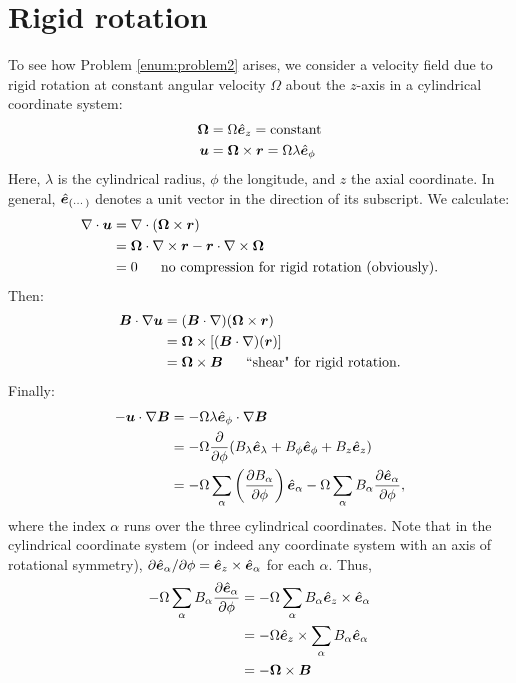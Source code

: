 \documentclass[12pt]{article}
\newcommand{\vecrot}{\bm{\Omega}}
\newcommand{\vecr}{\bm{r}}
\begin{document}
\section{Rigid rotation}
To see how Problem \ref{enum:problem2} arises, we consider a velocity field due to rigid rotation at constant angular velocity $\Omega$ about the $z$-axis in a cylindrical coordinate system:
\begin{subequations}
	\begin{align}
		\vecrot &= \Omega\ez=\text{constant}\\
		\vecu&=\vecrot\times\bm{r} = \Omega\lambda\ep
	\end{align}
\end{subequations}
Here, $\lambda$ is the cylindrical radius, $\phi$ the longitude, and $z$ the axial coordinate. In general,  $\hat{\bm{e}}_{(\cdots)}$ denotes a unit vector in the direction of its subscript. We calculate:
\begin{align}
	\Div\vecu&=\Div(\vecrot\times\bm{r})\nonumber\\
	&= \vecrot\dotgrad\times\vecr-\vecr\dotgrad\times\vecrot\nonumber\\
	&= 0\five\text{no compression for rigid rotation (obviously).}
\end{align}
Then:
\begin{align}
	\vecb\dotgrad\vecu&=(\vecb\dotgrad)(\vecrot\times\vecr)\nonumber\nonumber\\
	&= \vecrot\times[(\vecb\dotgrad)(\vecr)]\\
	&= \vecrot\times\vecb\five\text{``shear" for rigid rotation}.
\end{align}
Finally:
\begin{align*}
	-\bm{u}\cdot\nabla\bm{B} &= -\Omega\lambda\hat{\bm{e}}_\phi\cdot\nabla\bm{B}\\
	&=-\Omega\frac{\partial}{\partial\phi}(B_\lambda\hat{\bm{e}}_\lambda+B_\phi\hat{\bm{e}}_\phi+B_z\hat{\bm{e}}_z)\\
	&=-\Omega\sum_\alpha\left(\frac{\partial B_\alpha}{\partial\phi}\right)\hat{\bm{e}}_\alpha-\Omega\sum_\alpha B_\alpha\frac{\partial\hat{\bm{e}}_\alpha}{\partial\phi},
\end{align*}
where the index $\alpha$ runs over the three cylindrical coordinates. Note that in the cylindrical coordinate system (or indeed any coordinate system with an axis of rotational symmetry), $\partial\hat{\bm{e}}_\alpha/\partial\phi=\hat{\bm{e}}_z\times\hat{\bm{e}}_\alpha$ for each $\alpha$. Thus,
\begin{align*}
	-\Omega\sum_\alpha B_\alpha\pderiv{\e_\alpha}{\phi} &= -\Omega\sum_\alpha B_\alpha\ez\times\e_\alpha\\
	&=-\Omega\ez\times\sum_\alpha B_\alpha\e_\alpha\\
	&=-\vecrot\times\vecb
\end{align*}
\end{document}
